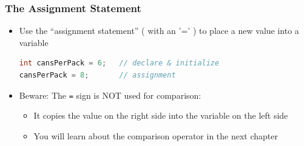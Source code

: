 \documentclass{beamer}
\begin{document}
\begin{frame}[t,fragile] \frametitle{The Assignment Statement} %
    \begin{itemize}
        \item Use the ``assignment statement'' ( with an '=' ) to place a new value into a variable
\begin{lstlisting}[language=Java]
int cansPerPack = 6;   // declare & initialize
cansPerPack = 8;       // assignment
\end{lstlisting}
        \item Beware: The \texttt{=} sign is NOT used for comparison:
        \begin{itemize}
            \item It copies the value on the right side into the variable on the left side
            \item You will learn about the comparison operator in the next chapter
        \end{itemize}
    \end{itemize}
\end{frame}
\end{document}
